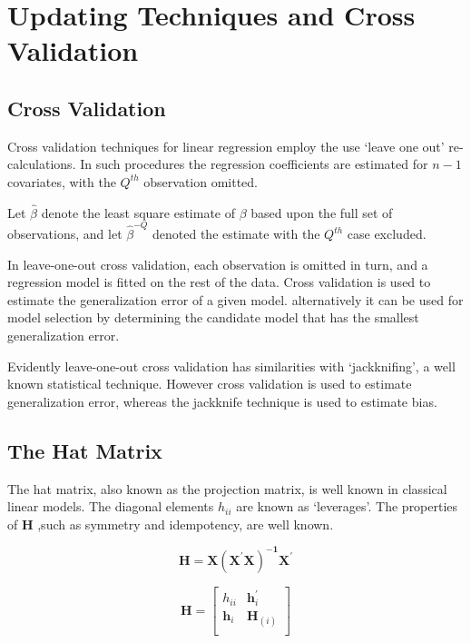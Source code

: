\documentclass[MAIN.tex]{subfiles}
\begin{document}
	\chapter{Updating Techniques and Cross Validation}
\section{Cross Validation} %

Cross validation techniques for linear regression employ the use `leave one out' re-calculations. In such procedures the regression coefficients are estimated for $n-1$ covariates, with the $Q^{th}$ observation omitted.

Let $\hat{\beta}$ denote the least square estimate of $\beta$ based upon the full set of observations, and let
$\hat{\beta}^{-Q}$ denoted the estimate with the $Q^{th}$ case
excluded.


In leave-one-out cross validation, each observation is omitted in turn, and a regression model is fitted on the rest of the data. Cross validation is used to estimate the generalization error of a given model. alternatively it can be used for model selection by determining the candidate model that has the smallest generalization error.


Evidently leave-one-out cross validation has similarities with `jackknifing', a well known statistical technique. However cross validation is used to estimate generalization error, whereas the jackknife technique is used to estimate bias.



	
	\section{The Hat Matrix}
	The hat matrix, also known as the projection matrix, is well known in classical linear models. The diagonal elements $h_{ii}$ are known as `leverages'. The properties of $\boldsymbol{H}$  ,such as symmetry and idempotency, are well known.
	
	
	\begin{equation*}
	\boldsymbol{H} =  \boldsymbol{X(X^{\prime}X)^{-1}X^{\prime}}
	\end{equation*}
	
	
	\begin{equation*}
	\boldsymbol{H} = \left[%
	\begin{array}{cc}
	h_{ii} & \boldsymbol{h}^{\prime}_{i}\\
	\boldsymbol{h}_{i} & \boldsymbol{H}_{(i)}\\
	\end{array}%
	\right]
	\end{equation*}
	
\end{document}
